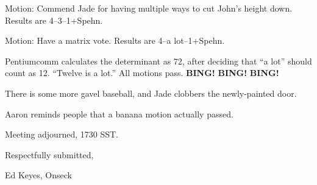 \documentclass[12pt]{article}
\newcommand{\bing}{{\bf BING!} }
\begin{document}
Motion: Commend Jade for having multiple ways to cut John's height
down.  Results are 4--3--1+Spehn.

Motion: Have a matrix vote.  Results are 4--a lot--1+Spehn.

Pentiumcomm calculates the determinant as 72, after deciding that ``a lot''
should count as 12.  ``Twelve is a lot.''  All motions pass.  \bing \bing
\bing

There is some more gavel baseball, and Jade clobbers the newly-painted
door.

Aaron reminds people that a banana motion actually passed.

\vspace{12pt}

\noindent
Meeting adjourned, 1730 SST.

\vspace{18pt}

\centerline{Respectfully submitted,}
\centerline{Ed Keyes, Onseck}
\end{document}
